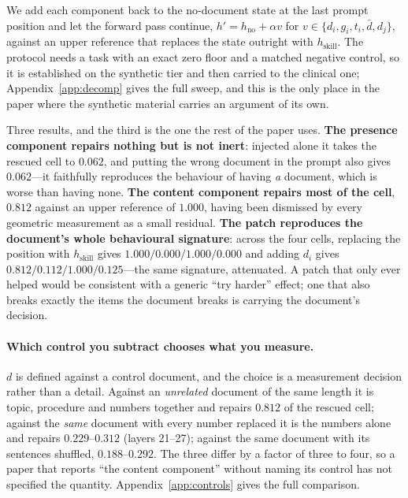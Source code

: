\documentclass{article}
\newcommand{\dvec}{\ensuremath{d}}
\newcommand{\gvec}{\ensuremath{g}}
\newcommand{\tvec}{\ensuremath{t}}
\begin{document}
We add each component back to the no-document state at the last prompt position
and let the forward pass continue, $h' = h_{\text{no}} + \alpha v$ for
$v \in \{\dvec_i, \gvec_i, \tvec_i, \bar{\dvec}, \dvec_j\}$, against an upper
reference that replaces the state outright with $h_{\text{skill}}$. The
protocol needs a task with an exact zero floor and a matched negative control,
so it is established on the synthetic tier and then carried to the clinical one;
Appendix~\ref{app:decomp} gives the full sweep, and this is the only place in
the paper where the synthetic material carries an argument of its own.

Three results, and the third is the one the rest of the paper uses.
\textbf{The presence component repairs nothing but is not inert}: injected
alone it takes the rescued cell to $0.062$, and putting the wrong document in
the prompt also gives $0.062$---it faithfully reproduces the behaviour of having
\emph{a} document, which is worse than having none. \textbf{The content
component repairs most of the cell}, $0.812$ against an upper reference of
$1.000$, having been dismissed by every geometric measurement as a small
residual. \textbf{The patch reproduces the document's whole behavioural
signature}: across the four cells, replacing the position with
$h_{\text{skill}}$ gives $1.000 / 0.000 / 1.000 / 0.000$ and adding $\dvec_i$
gives $0.812 / 0.112 / 1.000 / 0.125$---the same signature, attenuated. A patch
that only ever helped would be consistent with a generic ``try harder'' effect;
one that also breaks exactly the items the document breaks is carrying the
document's decision.

\paragraph{Which control you subtract chooses what you measure.} $\dvec$ is
defined against a control document, and the choice is a measurement decision
rather than a detail. Against an \emph{unrelated} document of the same length it
is topic, procedure and numbers together and repairs $0.812$ of the rescued
cell; against the \emph{same} document with every number replaced it is the
numbers alone and repairs $0.229$--$0.312$ (layers 21--27); against the same
document with its sentences shuffled, $0.188$--$0.292$. The three differ by a
factor of three to four, so a paper
that reports ``the content component'' without naming its control has not
specified the quantity. Appendix~\ref{app:controls} gives the full comparison.
\end{document}
